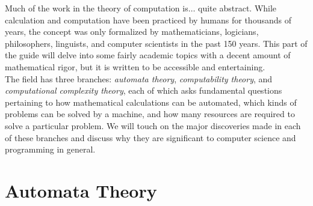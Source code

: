Much of the work in the theory of computation is$\dots$ quite abstract. While calculation and computation have been practiced by humans for thousands of years, the concept was only formalized by mathematicians, logicians, philosophers, linguists, and computer scientists in the past 150 years. This part of the guide will delve into some fairly academic topics with a decent amount of mathematical rigor, but it is written to be accessible and entertaining. \\

The field has three branches: \textit{automata theory}, \textit{computability theory}, and \textit{computational complexity theory}, each of which asks fundamental questions pertaining to how mathematical calculations can be automated, which kinds of problems can be solved by a machine, and how many resources are required to solve a particular problem. We will touch on the major discoveries made in each of these branches and discuss why they are significant to computer science and programming in general.




\toclineskip
\section{Automata Theory}



